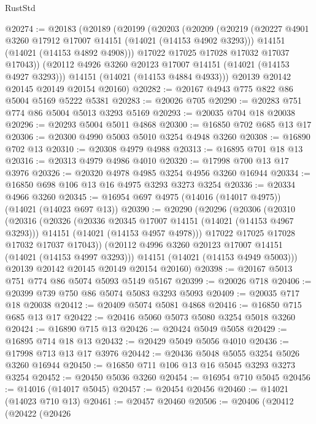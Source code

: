 \begin{lexlean}{RustStd}
\begin{coremodule}
@20274 := @20183
    (@20189
      (@20199
        (@20203
          (@20209
            (@20219
              (@20227 @4901 @3260 @17912 @17007 @14151 (@14021 (@14153 @4902 @3293)))
              @14151
              (@14021 (@14153 @4892 @4908)))
            @17022
            @17025
            @17028
            @17032
            @17037
            @17043))
        (@20112 @4926 @3260 @20123 @17007 @14151 (@14021 (@14153 @4927 @3293)))
        @14151
        (@14021 (@14153 @4884 @4933)))
      @20139
      @20142
      @20145
      @20149
      @20154
      @20160)
@20282 := @20167 @4943 @775 @822 @86 @5004 @5169 @5222 @5381
@20283 := @20026 @705
@20290 := @20283 @751 @774 @86 @5004 @5013 @3293 @5169
@20293 := @20035 @704 @18 @20038
@20296 := @20293 @5004 @5011 @4868
@20300 := @16850 @702 @685 @13 @17
@20306 := @20300 @4990 @5003 @5010 @3254 @4948 @3260
@20308 := @16890 @702 @13
@20310 := @20308 @4979 @4988
@20313 := @16895 @701 @18 @13
@20316 := @20313 @4979 @4986 @4010
@20320 := @17998 @700 @13 @17 @3976
@20326 := @20320 @4978 @4985 @3254 @4956 @3260 @16944
@20334 := @16850 @698 @106 @13 @16 @4975 @3293 @3273 @3254
@20336 := @20334 @4966 @3260
@20345 := @16954 @697 @4975 (@14016 (@14017 @4975)) (@14021 (@14023 @697 @13))
@20390 := @20290
    (@20296
      (@20306
        (@20310
          (@20316
            (@20326
              (@20336 @20345 @17007 @14151 (@14021 (@14153 @4967 @3293)))
              @14151
              (@14021 (@14153 @4957 @4978)))
            @17022
            @17025
            @17028
            @17032
            @17037
            @17043))
        (@20112 @4996 @3260 @20123 @17007 @14151 (@14021 (@14153 @4997 @3293)))
        @14151
        (@14021 (@14153 @4949 @5003)))
      @20139
      @20142
      @20145
      @20149
      @20154
      @20160)
@20398 := @20167 @5013 @751 @774 @86 @5074 @5093 @5149 @5167
@20399 := @20026 @718
@20406 := @20399 @739 @750 @86 @5074 @5083 @3293 @5093
@20409 := @20035 @717 @18 @20038
@20412 := @20409 @5074 @5081 @4868
@20416 := @16850 @715 @685 @13 @17
@20422 := @20416 @5060 @5073 @5080 @3254 @5018 @3260
@20424 := @16890 @715 @13
@20426 := @20424 @5049 @5058
@20429 := @16895 @714 @18 @13
@20432 := @20429 @5049 @5056 @4010
@20436 := @17998 @713 @13 @17 @3976
@20442 := @20436 @5048 @5055 @3254 @5026 @3260 @16944
@20450 := @16850 @711 @106 @13 @16 @5045 @3293 @3273 @3254
@20452 := @20450 @5036 @3260
@20454 := @16954 @710 @5045
@20456 := @14016 (@14017 @5045)
@20457 := @20454 @20456
@20460 := @14021 (@14023 @710 @13)
@20461 := @20457 @20460
@20506 := @20406
    (@20412
      (@20422
        (@20426

\end{coremodule}
\end{lexlean}
